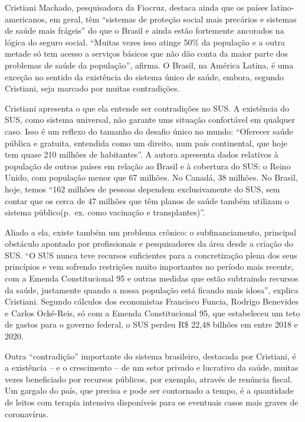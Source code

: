 \documentclass[
]{book}
\begin{document}
Cristiani Machado, pesquisadora da Fiocruz, destaca ainda que os países latino-americanos, em geral, têm ``sistemas de proteção social mais precários e sistemas de saúde mais frágeis'' do que o Brasil e ainda estão fortemente ancorados na lógica do seguro social. ``Muitas vezes isso atinge 50\% da população e a outra metade só tem acesso a serviços básicos que não dão conta da maior parte dos problemas de saúde da população'', afirma. O Brasil, na América Latina, é uma exceção no sentido da existência do sistema único de saúde, embora, segundo Cristiani, seja marcado por muitas contradições.

Cristiani apresenta o que ela entende ser contradições no SUS. A existência do SUS, como sistema universal, não garante ums situação confortável em qualquer caso. Isso é um reflexo do tamanho do desafio único no mundo: ``Oferecer saúde pública e gratuita, entendida como um direito, num país continental, que hoje tem quase 210 milhões de habitantes''. A autora apresenta dados relativos à população de outros países em relação ao Brasil e à cobertura do SUS: o Reino Unido, com população menor que 67 milhões. No Canadá, 38 milhões. No Brasil, hoje, temos ``162 milhões de pessoas dependem exclusivamente do SUS, sem contar que os cerca de 47 milhões que têm planos de saúde também utilizam o sistema público(p.~ex. como vacinação e transplantes)''.

Aliado a ela, existe também um problema crônico: o subfinanciamento, principal obstáculo apontado por profissionais e pesquisadores da área desde a criação do SUS. ``O SUS nunca teve recursos suficientes para a concretização plena dos seus princípios e vem sofrendo restrições muito importantes no período mais recente, com a Emenda Constitucional 95 e outras medidas que estão subtraindo recursos da saúde, justamente quando a nossa população está ficando mais idosa'', explica Cristiani. Segundo cálculos dos economistas Francisco Funcia, Rodrigo Benevides e Carlos Ocké-Reis, só com a Emenda Constitucional 95, que estabeleceu um teto de gastos para o governo federal, o SUS perdeu R\$ 22,48 bilhões em entre 2018 e 2020.

Outra ``contradição'' importante do sistema brasileiro, destacada por Cristiani, é a existência -- e o crescimento -- de um setor privado e lucrativo da saúde, muitas vezes beneficiado por recursos públicos, por exemplo, através de renúncia fiscal. Um gargalo do país, que precisa e pode ser contornado a tempo, é a quantidade de leitos com terapia intensiva disponíveis para os eventuais casos mais graves de coronavírus.
\end{document}
